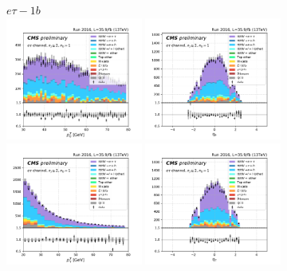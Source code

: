 \begin{figure}[ht]
    \centering
    $e\tau - 1b$ \\
    \includegraphics[width=0.4\textwidth]{chapters/Analysis/sectionPlots/figures/kinematics_pickles/etau/1b/etau_1b_lepton1_pt.pdf}
    \includegraphics[width=0.4\textwidth]{chapters/Analysis/sectionPlots/figures/kinematics_pickles/etau/1b/etau_1b_lepton1_eta.pdf}
    \includegraphics[width=0.4\textwidth]{chapters/Analysis/sectionPlots/figures/kinematics_pickles/etau/1b/etau_1b_lepton2_pt.pdf}
    \includegraphics[width=0.4\textwidth]{chapters/Analysis/sectionPlots/figures/kinematics_pickles/etau/1b/etau_1b_lepton2_eta.pdf}

\end{figure}
